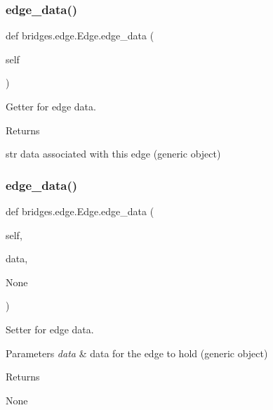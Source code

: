 \subsubsection{\texorpdfstring{edge\+\_\+data()}{edge\_data()}\hspace{0.1cm}{\footnotesize\ttfamily [1/2]}}
{\footnotesize\ttfamily def bridges.\+edge.\+Edge.\+edge\+\_\+data (\begin{DoxyParamCaption}\item[{}]{self }\end{DoxyParamCaption})}



Getter for edge data. 

\begin{DoxyReturn}{Returns}


str data associated with this edge (generic object) 
\end{DoxyReturn}
\mbox{\label{classbridges_1_1edge_1_1_edge_a7429980b52d754159629c73c316cbc41}} 
\subsubsection{\texorpdfstring{edge\+\_\+data()}{edge\_data()}\hspace{0.1cm}{\footnotesize\ttfamily [2/2]}}
{\footnotesize\ttfamily def bridges.\+edge.\+Edge.\+edge\+\_\+data (\begin{DoxyParamCaption}\item[{}]{self,  }\item[{}]{data,  }\item[{}]{None }\end{DoxyParamCaption})}



Setter for edge data. 


\begin{DoxyParams}{Parameters}
{\em data} & data for the edge to hold (generic object) \\
\hline
\end{DoxyParams}
\begin{DoxyReturn}{Returns}


None 
\end{DoxyReturn}
\mbox{\label{classbridges_1_1edge_1_1_edge_a63bf9365bcaa4e07d687b845b1d6f9f2}} 
